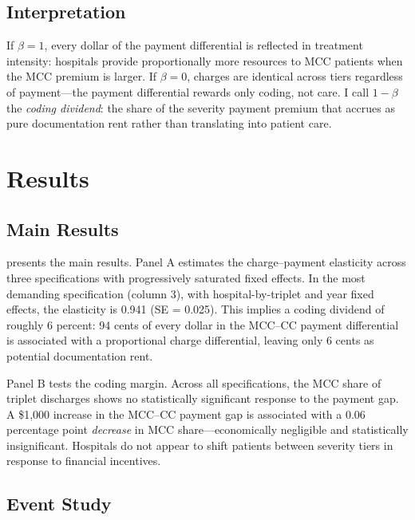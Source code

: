 \documentclass[12pt]{article}
\begin{document}
\subsection{Interpretation}

If $\beta = 1$, every dollar of the payment differential is reflected in treatment intensity: hospitals provide proportionally more resources to MCC patients when the MCC premium is larger. If $\beta = 0$, charges are identical across tiers regardless of payment---the payment differential rewards only coding, not care. I call $1 - \beta$ the \textit{coding dividend}: the share of the severity payment premium that accrues as pure documentation rent rather than translating into patient care.

\section{Results}
\label{sec:results}

\subsection{Main Results}



 presents the main results. Panel A estimates the charge--payment elasticity across three specifications with progressively saturated fixed effects. In the most demanding specification (column 3), with hospital-by-triplet and year fixed effects, the elasticity is 0.941 (SE = 0.025). This implies a coding dividend of roughly 6 percent: 94 cents of every dollar in the MCC--CC payment differential is associated with a proportional charge differential, leaving only 6 cents as potential documentation rent.

Panel B tests the coding margin. Across all specifications, the MCC share of triplet discharges shows no statistically significant response to the payment gap. A \$1,000 increase in the MCC--CC payment gap is associated with a 0.06 percentage point \textit{decrease} in MCC share---economically negligible and statistically insignificant. Hospitals do not appear to shift patients between severity tiers in response to financial incentives.

\subsection{Event Study}


\end{document}
